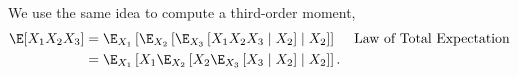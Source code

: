 \documentclass{article}
\begin{document}
We use the same idea to compute a third-order moment,
\begin{align}
  \E[ X_1 X_2 X_3 ]
  &= \E_{X_1}\left[ \E_{X_2} \left[ \E_{X_3}\left[ X_1 X_2 X_3 \mid X_2 \right] \mid X_2 \right] \right] && \text{Law of Total Expectation} \\
  &= \E_{X_1}\left[  X_1 \E_{X_2} \left[ X_2 \E_{X_3}\left[ X_3 \mid X_2 \right] \mid X_2 \right] \right].
\end{align}
\end{document}
